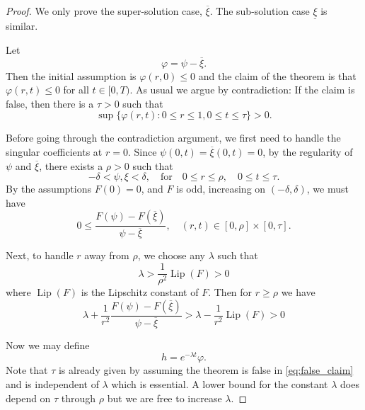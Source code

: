 \documentclass{amsart}
\begin{document}
\begin{proof}
We only prove the super-solution case, \(\overline{\xi}\). The sub-solution case \(\underline{\xi}\) is similar.

Let
\[
\varphi = \psi - \overline{\xi}.
\]
Then the initial assumption is \(\varphi(r, 0) \leq 0\) and the claim of the theorem is that \(\varphi(r, t) \leq 0\) for all \(t \in [0, T)\). As usual we argue by contradiction: If the claim is false, then there is a \(\tau > 0\) such that
\begin{equation}
\label{eq:false_claim}
\sup \{\varphi(r, t) : 0 \leq r \leq 1, 0 \leq t \leq \tau\} > 0.
\end{equation}

Before going through the contradiction argument, we first need to handle the singular coefficients at \(r = 0\). Since \(\psi(0, t) = \overline{\xi}(0, t) = 0\), by the regularity of \(\psi\) and \(\overline{\xi}\), there exists a \(\rho > 0\) such that
\[
-\delta < \psi, \xi < \delta, \quad \text{for} \quad 0 \leq r \leq \rho, \quad 0 \leq t \leq \tau.
\]
By the assumptions \(F(0) = 0\), and \(F\) is odd, increasing on \((-\delta,\delta)\), we must have
\begin{equation}
\label{eq:near_positive}
0 \leq \frac{F(\psi) - F(\overline{\xi})}{\psi - \overline{\xi}}, \quad (r, t) \in [0, \rho] \times [0, \tau].
\end{equation}

Next, to handle \(r\) away from \(\rho\), we choose any \(\lambda\) such that
\[
\lambda > \frac{1}{\rho^2} \operatorname{Lip} (F) > 0
\]
where \(\operatorname{Lip} (F)\) is the Lipschitz constant of \(F\). Then for  \(r \geq \rho\) we have
\begin{equation}
\label{eq:far_positive}
\lambda + \frac{1}{r^2} \frac{F(\psi) - F(\overline{\xi})}{\psi - \overline{\xi}} > \lambda - \frac{1}{r^2} \operatorname{Lip} (F) > 0
\end{equation}

Now we may define
\[
h = e^{-\lambda t} \varphi.
\]
Note that \(\tau\) is already given by assuming the theorem is false in \eqref{eq:false_claim} and is independent of \(\lambda\) which is essential. A lower bound for the constant \(\lambda\) does depend on \(\tau\) through \(\rho\) but we are free to increase \(\lambda\).


\end{proof}
\end{document}

